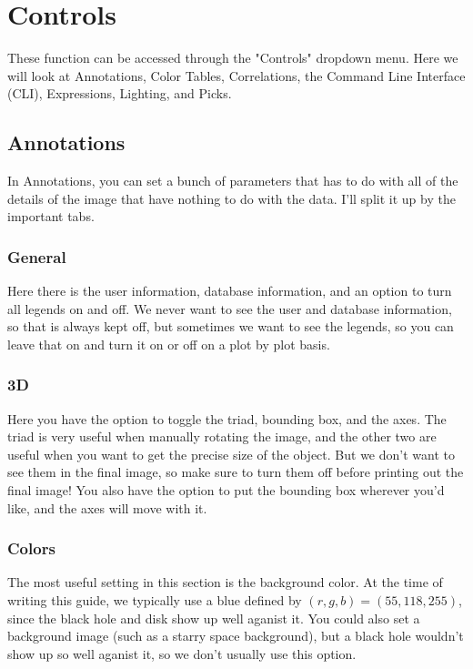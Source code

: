 \documentclass[english]{article}
\begin{document}
\section{Controls}
These function can be accessed through the "Controls" dropdown menu. Here we will look at Annotations, 
Color Tables, Correlations, the Command Line Interface (CLI), Expressions, Lighting, and Picks.
    
    \subsection{Annotations}
    In Annotations, you can set a bunch of parameters that has to do with all of the details of the image
    that have nothing to do with the data. I'll split it up by the important tabs.
    
        \subsubsection{General}
        Here there is the user information, database information, and an option to turn all legends on 
        and off. We never want to see the user and database information, so that is always kept off, but
        sometimes we want to see the legends, so you can leave that on and turn it on or off on a plot
        by plot basis.

        \subsubsection{3D}
        Here you have the option to toggle the triad, bounding box, and the axes. The triad is very useful
        when manually rotating the image, and the other two are useful when you want to get the precise 
        size of the object. But we don't want to see them in the final image, so make sure to turn them
        off before printing out the final image! You also have the option to put the bounding box wherever
        you'd like, and the axes will move with it.

        \subsubsection{Colors}
        The most useful setting in this section is the background color. At the time of writing this guide,
        we typically use a blue defined by $(r,g,b) = (55,118,255)$, since the black hole and disk show
        up well aganist it. You could also set a background image (such as a starry space background), but
        a black hole wouldn't show up so well aganist it, so we don't usually use this option.
\end{document}
